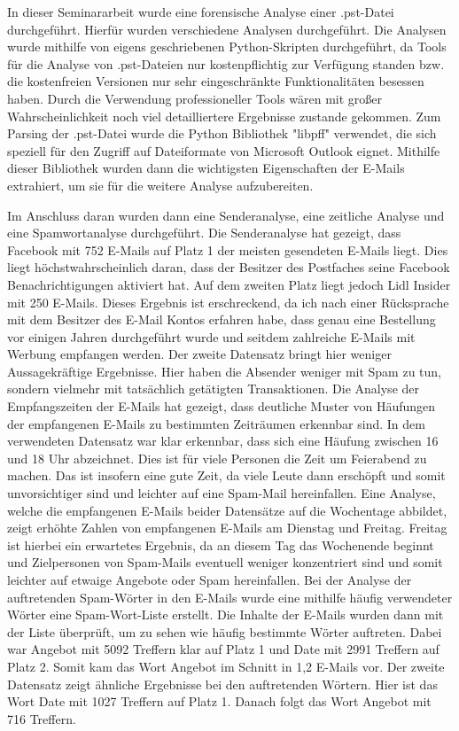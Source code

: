 \noindent In dieser Seminararbeit wurde eine forensische Analyse einer .pst-Datei durchgeführt. Hierfür wurden verschiedene Analysen durchgeführt. Die Analysen wurde mithilfe von eigens geschriebenen Python-Skripten durchgeführt, da Tools für die Analyse von .pst-Dateien nur kostenpflichtig zur Verfügung standen bzw. die kostenfreien Versionen nur sehr eingeschränkte Funktionalitäten besessen haben. Durch die Verwendung professioneller Tools wären mit großer Wahrscheinlichkeit noch viel detailliertere Ergebnisse zustande gekommen. Zum Parsing der .pst-Datei wurde die Python Bibliothek "libpff" verwendet, die sich speziell für den Zugriff auf Dateiformate von Microsoft Outlook eignet. Mithilfe dieser Bibliothek wurden dann die wichtigsten Eigenschaften der E-Mails extrahiert, um sie für die weitere Analyse aufzubereiten. \smallskip


\noindent Im Anschluss daran wurden dann eine Senderanalyse, eine zeitliche Analyse und eine Spamwortanalyse durchgeführt. Die Senderanalyse hat gezeigt, dass Facebook mit 752 E-Mails auf Platz 1 der meisten gesendeten E-Mails liegt. Dies liegt höchstwahrscheinlich daran, dass der Besitzer des Postfaches seine Facebook Benachrichtigungen aktiviert hat. Auf dem zweiten Platz liegt jedoch \glqq{}Lidl Insider\grqq{} mit 250 E-Mails. Dieses Ergebnis ist erschreckend, da ich nach einer Rücksprache mit dem Besitzer des E-Mail Kontos erfahren habe, dass genau eine Bestellung vor einigen Jahren durchgeführt wurde und seitdem zahlreiche E-Mails mit Werbung empfangen werden. Der zweite Datensatz bringt hier weniger Aussagekräftige Ergebnisse. Hier haben die Absender weniger mit Spam zu tun, sondern vielmehr mit tatsächlich getätigten Transaktionen. Die Analyse der Empfangszeiten der E-Mails hat gezeigt, dass deutliche Muster von Häufungen der empfangenen E-Mails zu bestimmten Zeiträumen erkennbar sind. In dem verwendeten Datensatz war klar erkennbar, dass sich eine Häufung zwischen 16 und 18 Uhr abzeichnet. Dies ist für viele Personen die Zeit um Feierabend zu machen. Das ist insofern eine gute Zeit, da viele Leute dann erschöpft und somit unvorsichtiger sind und leichter auf eine Spam-Mail hereinfallen. Eine Analyse, welche die empfangenen E-Mails beider Datensätze auf die Wochentage abbildet, zeigt erhöhte Zahlen von empfangenen E-Mails am Dienstag und Freitag. Freitag ist hierbei ein erwartetes Ergebnis, da an diesem Tag das Wochenende beginnt und Zielpersonen von Spam-Mails eventuell weniger konzentriert sind und somit leichter auf etwaige Angebote oder Spam hereinfallen. Bei der Analyse der auftretenden Spam-Wörter in den E-Mails wurde eine mithilfe häufig verwendeter Wörter eine \glqq{}Spam-Wort-Liste\grqq{} erstellt. Die Inhalte der E-Mails wurden dann mit der Liste überprüft, um zu sehen wie häufig bestimmte Wörter auftreten. Dabei war \glqq{}Angebot\grqq{} mit 5092 Treffern klar auf Platz 1 und \glqq{}Date\grqq{} mit 2991 Treffern auf Platz 2. Somit kam das Wort Angebot im Schnitt in 1,2 E-Mails vor. Der zweite Datensatz zeigt ähnliche Ergebnisse bei den auftretenden Wörtern. Hier ist das Wort \glqq{}Date\grqq{} mit 1027 Treffern auf Platz 1. Danach folgt das Wort \glqq{}Angebot\grqq{} mit 716 Treffern. \smallskip


